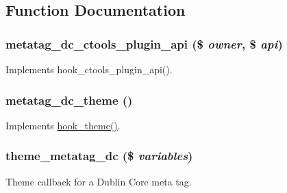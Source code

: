 \subsection{Function Documentation}
\hypertarget{metatag__dc_8module_ad13aa8542c256fc1688bb77690664935}{
\subsubsection[{metatag\_\-dc\_\-ctools\_\-plugin\_\-api}]{\setlength{\rightskip}{0pt plus 5cm}metatag\_\-dc\_\-ctools\_\-plugin\_\-api (\$ {\em owner}, \/  \$ {\em api})}}
\label{metatag__dc_8module_ad13aa8542c256fc1688bb77690664935}
Implements hook\_\-ctools\_\-plugin\_\-api(). \hypertarget{metatag__dc_8module_ab23a5108a08f5a66bfc7bb0916e5f565}{
\subsubsection[{metatag\_\-dc\_\-theme}]{\setlength{\rightskip}{0pt plus 5cm}metatag\_\-dc\_\-theme ()}}
\label{metatag__dc_8module_ab23a5108a08f5a66bfc7bb0916e5f565}
Implements \hyperlink{group__hooks_ga013ccb45c7aaab1c16cf9691428c910d}{hook\_\-theme()}. \hypertarget{metatag__dc_8module_a412ba54840310828b63e2dc0c553dd4d}{
\subsubsection[{theme\_\-metatag\_\-dc}]{\setlength{\rightskip}{0pt plus 5cm}theme\_\-metatag\_\-dc (\$ {\em variables})}}
\label{metatag__dc_8module_a412ba54840310828b63e2dc0c553dd4d}
Theme callback for a Dublin Core meta tag. 